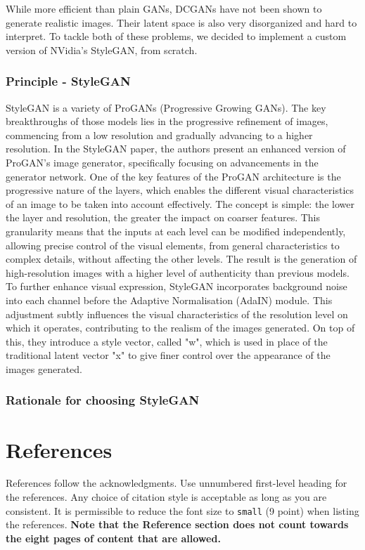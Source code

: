 \documentclass{article}
\begin{document}
While more efficient than plain GANs, DCGANs have not been shown to generate realistic images. Their latent space is also very disorganized and hard to interpret. To tackle both of these problems, we decided to implement a custom version of NVidia’s StyleGAN, from scratch.

\subsubsection*{Principle - StyleGAN}
StyleGAN is a variety of ProGANs (Progressive Growing GANs). The key breakthroughs of those models lies in the progressive refinement of images, commencing from a low resolution and gradually advancing to a higher resolution. In the StyleGAN paper, the authors present an enhanced version of ProGAN's image generator, specifically focusing on advancements in the generator network.
One of the key features of the ProGAN architecture is the progressive nature of the layers, which enables the different visual characteristics of an image to be taken into account effectively. The concept is simple: the lower the layer and resolution, the greater the impact on coarser features. This granularity means that the inputs at each level can be modified independently, allowing precise control of the visual elements, from general characteristics to complex details, without affecting the other levels. The result is the generation of high-resolution images with a higher level of authenticity than previous models.
To further enhance visual expression, StyleGAN incorporates background noise into each channel before the Adaptive Normalisation (AdaIN) module. This adjustment subtly influences the visual characteristics of the resolution level on which it operates, contributing to the realism of the images generated.
On top of this, they introduce a style vector, called "w", which is used in place of the traditional latent vector "x" to give finer control over the appearance of the images generated.

\subsubsection*{Rationale for choosing StyleGAN}

\section*{References}

References follow the acknowledgments. Use unnumbered first-level heading for
the references. Any choice of citation style is acceptable as long as you are
consistent. It is permissible to reduce the font size to \verb+small+ (9 point)
when listing the references.
{\bf Note that the Reference section does not count towards the eight pages of content that are allowed.}
\medskip
\end{document}
